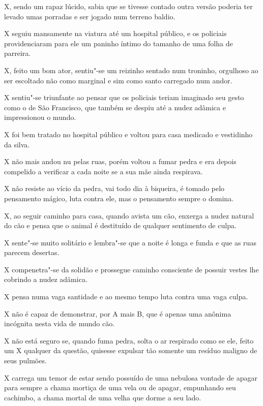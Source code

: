 X, sendo um rapaz lúcido, sabia que se tivesse contado outra versão
poderia ter levado umas porradas e ser jogado num terreno baldio.

X seguiu mansamente na viatura até um hospital público, e os policiais
providenciaram para ele um paninho íntimo do tamanho de uma folha de
parreira.

X, feito um bom ator, sentiu"-se um reizinho sentado num troninho,
orgulhoso ao ser escoltado não como marginal e sim como santo carregado
num andor.

X sentiu"-se triunfante ao pensar que os policiais teriam imaginado seu
gesto como o de São Francisco, que também se despiu até a nudez adâmica
e impressionou o mundo.

X foi bem tratado no hospital público e voltou para casa medicado e
vestidinho da silva.

X não mais andou nu pelas ruas, porém voltou a fumar pedra e era depois
compelido a verificar a cada noite se a sua mãe ainda respirava.

X não resiste ao vício da pedra, vai todo dia à biqueira, é tomado pelo
pensamento mágico, luta contra ele, mas o pensamento sempre o domina.

X, ao seguir caminho para casa, quando avista um cão, enxerga a nudez
natural do cão e pensa que o animal é destituído de qualquer sentimento
de culpa.

X sente"-se muito solitário e lembra"-se que a noite é longa e funda e que
as ruas parecem desertas.

X compenetra"-se da solidão e prossegue caminho consciente de possuir
vestes lhe cobrindo a nudez adâmica.

X pensa numa vaga santidade e ao mesmo tempo luta contra uma vaga culpa.

X não é capaz de demonstrar, por A mais B, que é apenas uma anônima
incógnita nesta vida de mundo cão.

X não está seguro se, quando fuma pedra, solta o ar respirado como se
ele, feito um X qualquer da questão, quisesse expulsar tão somente um
resíduo maligno de seus pulmões.

X carrega um temor de estar sendo possuído de uma nebulosa vontade de
apagar para sempre a chama mortiça de uma vela ou de apagar, empunhando
seu cachimbo, a chama mortal de uma velha que dorme a seu lado.

\begin{center}\asterisc{}\end{center}
\begingroup\small

